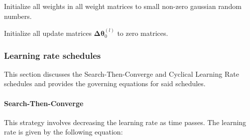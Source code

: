 \documentclass{article}
\begin{document}
\begin{algorithm}
		\SetAlgoLined
		
		Initialize all weights in all weight matrices to small non-zero gaussian random numbers.
		
		Initialize all update matrices $\boldsymbol{\Delta\theta}^{(l)}_0$ to zero matrices.
		
	
\end{algorithm}
\hfill\newpage

\subsubsection{Learning rate schedules}

This section discusses the Search-Then-Converge and Cyclical Learning Rate schedules and provides the governing equations for said schedules.


\paragraph{Search-Then-Converge}
This strategy involves decreasing the learning rate as time passes. The learning rate is given by the following equation:
\end{document}
